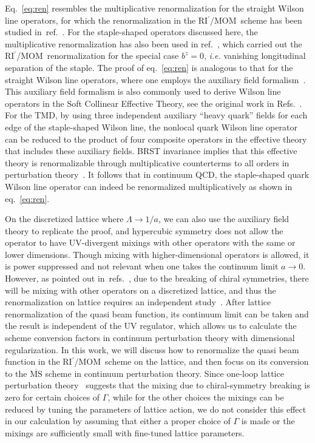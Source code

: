 \documentclass[11pt,a4paper]{article}
\DeclareRobustCommand{\Eq}[1]{Eq.~\eqref{eq:#1}}
\DeclareRobustCommand{\eq}[1]{eq.~\eqref{eq:#1}}
\DeclareRobustCommand{\mycite}[1]{ref.~\cite{#1}}
\DeclareRobustCommand{\mycites}[1]{refs.~\cite{#1}}
\newcommand{\MS}{{\overline{\mathrm{MS}}}}
\newcommand{\RIpMOM}{RI$^\prime$/MOM}
\begin{document}
\Eq{ren} resembles the multiplicative renormalization for the straight Wilson line operators,
for which the renormalization in the \RIpMOM~scheme has been studied in~\mycite{Constantinou:2017sej,Stewart:2017tvs,Chen:2017mzz,Alexandrou:2017huk,Liu:2018uuj}.
For the staple-shaped operators discussed here, the multiplicative renormalization has also been used in \mycite{Constantinou:2019vyb}, which carried out the \RIpMOM~renormalization for the special case $b^z=0$, \emph{i.e.} vanishing longitudinal separation of the staple. The proof of \eq{ren} is analogous to that for the straight Wilson line operators, where one employs the auxiliary field formalism~\cite{Dorn:1986dt,Ji:2017oey,Green:2017xeu,Zhang:2018diq}. This auxiliary field formalism is also commonly used to derive Wilson line operators in the Soft Collinear Effective Theory, see the original work in Refs.~\cite{Bauer:2001yt,Bauer:2002nz}.
For the TMD, by using three independent auxiliary ``heavy quark'' fields for each edge of the
staple-shaped Wilson line, the nonlocal quark Wilson line operator can be reduced to the
product of four composite operators in the effective theory that includes these auxiliary fields.
BRST invariance implies that this effective theory is renormalizable through multiplicative counterterms
to all orders in perturbation theory~\cite{Ji:2017oey}. It follows that in continuum QCD,
the staple-shaped quark Wilson line operator can indeed be renormalized multiplicatively as shown in \eq{ren}.

On the discretized lattice where $\Lambda\to 1/a$, we can also use the auxiliary field theory to replicate the proof, and hypercubic symmetry does not allow the operator to have UV-divergent mixings with other operators with the same or lower dimensions. Though mixing with higher-dimensional operators is allowed, it is power suppressed and not relevant when one takes the continuum limit $a\to0$. However, as pointed out in~\mycites{Constantinou:2019vyb,Yoon:2017qzo}, due to the breaking of chiral symmetries, there will be mixing with other operators on a discretized lattice, and thus the renormalization on lattice requires an independent study~\cite{Yoon:2017qzo,Shanahan:2019zcq}. After lattice renormalization of the quasi beam function, its continuum limit can be taken and the result is independent of the UV regulator, which allows us to calculate the scheme conversion factors in continuum perturbation theory with dimensional regularization. 
In this work, we will discuss how to renormalize the quasi beam function in the \RIpMOM~scheme on the lattice, and then focus on its conversion to the $\MS$ scheme in continuum perturbation theory. Since one-loop lattice perturbation theory~\cite{Constantinou:2019vyb} suggests that the mixing due to chiral-symmetry breaking is zero for certain choices of $\Gamma$, while for the other choices the mixings can be reduced by tuning the parameters of lattice action, we do not consider this effect in our calculation by assuming that either a proper choice of $\Gamma$ is made or the mixings are sufficiently small with fine-tuned lattice parameters.
\end{document}
